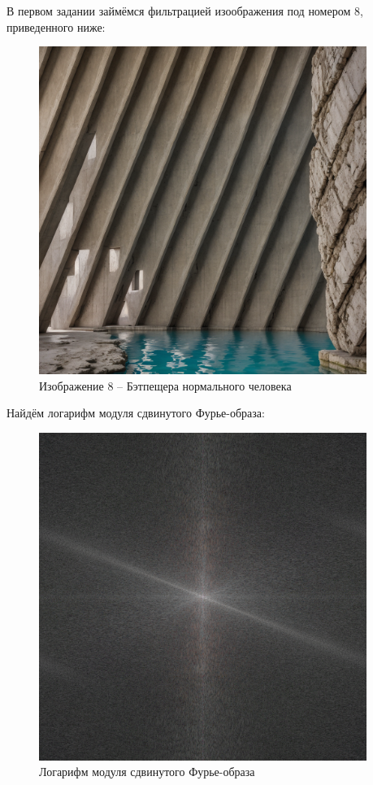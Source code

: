 В первом задании займёмся фильтрацией изоображения под номером 8, приведенного ниже:
\vspace{1cm}
\begin{figure}[ht!]
    \centering
    \includegraphics[width=0.95\textwidth]{images/source_images/task_1/8.png}
    \caption{Изображение 8 -- Бэтпещера нормального человека}
    \label{fig:photo_8}
\end{figure}
\clearpage
Найдём логарифм модуля сдвинутого Фурье-образа:
\vspace{1.5cm}
\begin{figure}[ht!]
    \centering
    \includegraphics[width=0.95\textwidth]{images/result/task_1/Fourier_8.png}
    \caption{Логарифм модуля сдвинутого Фурье-образа}
    \label{fig:image_8}
\end{figure}
\vspace{1cm}

